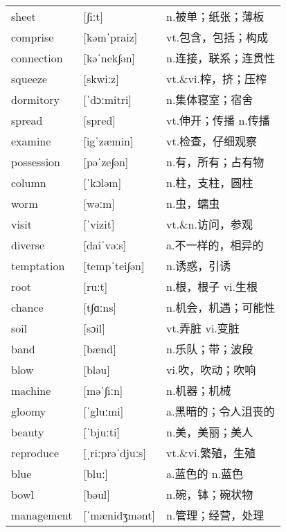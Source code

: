 \documentclass[a4paper]{article}
\begin{document}
\section{}
\begin{tabular}{l l l}

sheet & [∫iːt] & n.被单；纸张；薄板 \\
comprise & [kəmˈpraiz] & vt.包含，包括；构成 \\
connection & [kəˈnek∫ən] & n.连接，联系；连贯性 \\
squeeze & [skwiːz] & vt.\&vi.榨，挤；压榨 \\
dormitory & [ˈdɔːmitri] & n.集体寝室；宿舍 \\
spread & [spred] & vt.伸开；传播 n.传播 \\
examine & [igˈzæmin] & vt.检查，仔细观察 \\
possession & [pəˈze∫ən] & n.有，所有；占有物 \\
column & [ˈkɔləm] & n.柱，支柱，圆柱 \\
worm & [wəːm] & n.虫，蠕虫 \\
visit & [ˈvizit] & vt.\&n.访问，参观 \\
diverse & [daiˈvəːs] & a.不一样的，相异的 \\
temptation & [tempˈtei∫ən] & n.诱惑，引诱 \\
root & [ruːt] & n.根，根子 vi.生根 \\
chance & [t∫ɑːns] & n.机会，机遇；可能性 \\
soil & [sɔil] & vt.弄脏 vi.变脏 \\
band & [bænd] & n.乐队；带；波段 \\
blow & [bləu] & vi.吹，吹动；吹响 \\
machine & [məˈ∫iːn] & n.机器；机械 \\
gloomy & [ˈgluːmi] & a.黑暗的；令人沮丧的 \\
beauty & [ˈbjuːti] & n.美，美丽；美人 \\
reproduce & [ˌriːprəˈdjuːs] & vt.\&vi.繁殖，生殖 \\
blue & [bluː] & a.蓝色的 n.蓝色 \\
bowl & [bəul] & n.碗，钵；碗状物 \\
management & [ˈmænidʒmənt] & n.管理；经营，处理 \\

\end{tabular}
\end{document}
